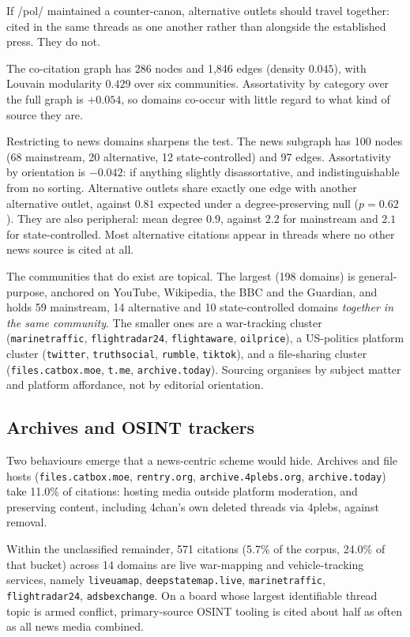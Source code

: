 \documentclass[11pt]{article}
\begin{document}
If /pol/ maintained a counter-canon, alternative outlets should travel together:
cited in the same threads as one another rather than alongside the established
press. They do not.

The co-citation graph has 286 nodes and 1{,}846 edges (density $0.045$), with
Louvain modularity $0.429$ over six communities. Assortativity by category over
the full graph is $+0.054$, so domains co-occur with little regard to what kind of
source they are.

Restricting to news domains sharpens the test. The news subgraph has 100 nodes
(68 mainstream, 20 alternative, 12 state-controlled) and 97 edges. Assortativity
by orientation is $\mathbf{-0.042}$: if anything slightly disassortative, and
indistinguishable from no sorting. Alternative outlets share exactly one edge
with another alternative outlet, against $0.81$ expected under a
degree-preserving null ($p=0.62$). They are also peripheral: mean degree $0.9$,
against $2.2$ for mainstream and $2.1$ for state-controlled. Most alternative
citations appear in threads where no other news source is cited at all.

The communities that do exist are topical. The largest (198 domains) is
general-purpose, anchored on YouTube, Wikipedia, the BBC and the Guardian, and
holds 59 mainstream, 14 alternative and 10 state-controlled domains
\emph{together in the same community}. The smaller ones are a war-tracking
cluster (\texttt{marinetraffic}, \texttt{flightradar24}, \texttt{flightaware},
\texttt{oilprice}), a US-politics platform cluster (\texttt{twitter},
\texttt{truthsocial}, \texttt{rumble}, \texttt{tiktok}), and a file-sharing
cluster (\texttt{files.catbox.moe}, \texttt{t.me}, \texttt{archive.today}).
Sourcing organises by subject matter and platform affordance, not by editorial
orientation.

\subsection{Archives and OSINT trackers}

Two behaviours emerge that a news-centric scheme would hide. Archives and file
hosts (\texttt{files.catbox.moe}, \texttt{rentry.org},
\texttt{archive.4plebs.org}, \texttt{archive.today}) take 11.0\% of citations:
hosting media outside platform moderation, and preserving content, including
4chan's own deleted threads via 4plebs, against removal.

Within the unclassified remainder, 571 citations (5.7\% of the corpus, 24.0\% of
that bucket) across 14 domains are live war-mapping and vehicle-tracking
services, namely \texttt{liveuamap}, \texttt{deepstatemap.live}, \texttt{marinetraffic},
\texttt{flightradar24}, \texttt{adsbexchange}. On a board whose largest
identifiable thread topic is armed conflict, primary-source OSINT tooling is
cited about half as often as all news media combined.
\end{document}
